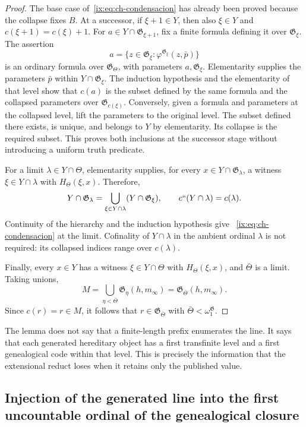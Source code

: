 \begin{proof}
The base case of~\eqref{ix:eq:ch-condensacion} has already been proved because the
collapse fixes \(B\). At a successor, if \(\xi+1\in Y\), then also
\(\xi\in Y\) and \(c(\xi+1)=c(\xi)+1\). For
\(a\in Y\cap\mathfrak G_{\xi+1}\), fix a finite formula defining it over
\(\mathfrak G_\xi\). The assertion
\[
 a=\{z\in\mathfrak G_\xi:
                  \varphi^{\mathfrak G_\xi}(z,\bar p)\}
\]
is an ordinary formula over \(\mathfrak G_\Theta\), with parameters
\(a,\mathfrak G_\xi\). Elementarity supplies the parameters \(\bar p\) within
\(Y\cap\mathfrak G_\xi\). The induction hypothesis and the elementarity of
that level show that \(c(a)\) is the subset defined by the same formula and
the collapsed parameters over \(\mathfrak G_{c(\xi)}\). Conversely, given a
formula and parameters at the collapsed level, lift the parameters to the
original level. The subset defined there exists, is unique, and belongs to
\(Y\) by elementarity. Its collapse is the required subset. This proves both
inclusions at the successor stage without introducing a uniform truth
predicate.

For a limit \(\lambda\in Y\cap\Theta\), elementarity supplies, for every
\(x\in Y\cap\mathfrak G_\lambda\), a witness \(\xi\in Y\cap\lambda\) with
\(H_\Theta(\xi,x)\). Therefore,
\[
 Y\cap\mathfrak G_\lambda
 =\bigcup_{\xi\in Y\cap\lambda}(Y\cap\mathfrak G_\xi),
 \qquad c``(Y\cap\lambda)=c(\lambda).
\]
Continuity of the hierarchy and the induction hypothesis give
~\eqref{ix:eq:ch-condensacion} at the limit. Cofinality of \(Y\cap\lambda\) in
the ambient ordinal \(\lambda\) is not required: its collapsed indices range
over \(c(\lambda)\).

Finally, every \(x\in Y\) has a witness \(\xi\in Y\cap\Theta\) with
\(H_\Theta(\xi,x)\), and \(\bar\Theta\) is a limit. Taking unions,
\[
 M=\bigcup_{\eta<\bar\Theta}\mathfrak G_\eta(h,m_\infty)
  =\mathfrak G_{\bar\Theta}(h,m_\infty).
\]
Since \(c(r)=r\in M\), it follows that
\(r\in\mathfrak G_{\bar\Theta}\) with
\(\bar\Theta<\omega_1^{\mathfrak G}\).
\end{proof}

The lemma does not say that a finite-length prefix enumerates the line. It says that
each generated hereditary object has a first transfinite level and a first
genealogical code within that level. This is precisely the information that
the extensional reduct loses when it retains only the published value.

\subsection{Injection of the generated line into the first uncountable ordinal of the genealogical closure}

